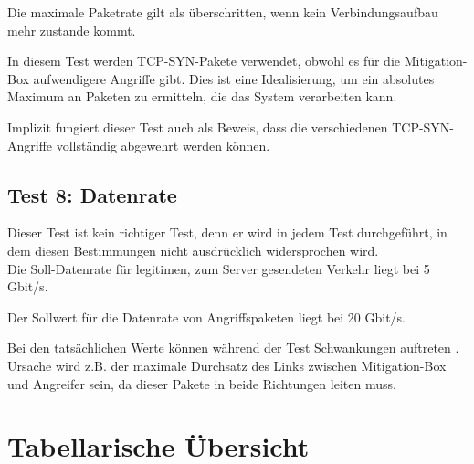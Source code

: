 \documentclass[../review_1.tex]{subfiles}
\begin{document}
Die maximale Paketrate gilt als überschritten, wenn kein Verbindungsaufbau mehr zustande kommt. 

In diesem Test werden TCP-SYN-Pakete verwendet, obwohl es für die Mitigation-Box aufwendigere Angriffe gibt. Dies ist eine Idealisierung, um ein absolutes Maximum an Paketen zu ermitteln, die das System verarbeiten kann.

Implizit fungiert dieser Test auch als Beweis, dass die verschiedenen TCP-SYN-Angriffe vollständig abgewehrt werden können.

\subsection{Test 8: Datenrate}
Dieser Test ist kein richtiger Test, denn er wird in jedem Test durchgeführt, in dem diesen Bestimmungen nicht ausdrücklich widersprochen wird.\\
Die Soll-Datenrate für legitimen, zum Server gesendeten Verkehr liegt bei 5 Gbit/s.

Der Sollwert für die Datenrate von Angriffspaketen liegt bei 20 Gbit/s.

Bei den tatsächlichen Werte können während der Test Schwankungen auftreten . Ursache wird z.B. der maximale Durchsatz des Links zwischen Mitigation-Box und Angreifer sein, da dieser Pakete in beide Richtungen leiten muss.


\section{Tabellarische Übersicht}
\end{document}
